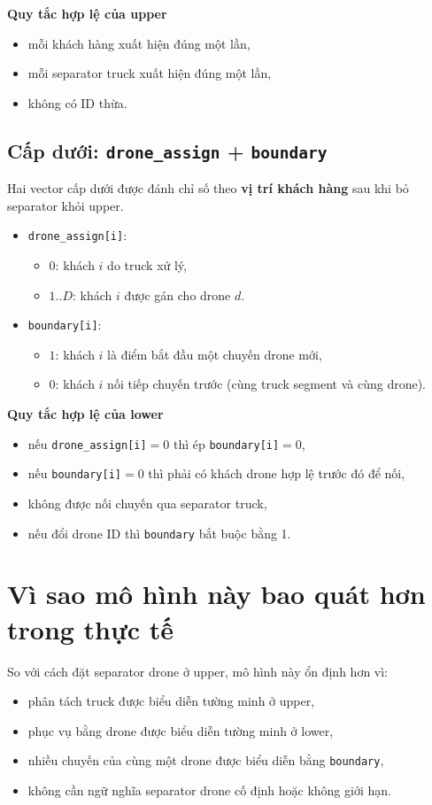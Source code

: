 \documentclass[12pt,a4paper]{article}
\begin{document}
\textbf{Quy tắc hợp lệ của upper}
\begin{itemize}[leftmargin=1.2cm]
    \item mỗi khách hàng xuất hiện đúng một lần,
    \item mỗi separator truck xuất hiện đúng một lần,
    \item không có ID thừa.
\end{itemize}

\subsection{Cấp dưới: \texttt{drone\_assign} + \texttt{boundary}}
Hai vector cấp dưới được đánh chỉ số theo \textbf{vị trí khách hàng} sau khi bỏ separator khỏi upper.

\begin{itemize}[leftmargin=1.2cm]
    \item \texttt{drone\_assign[i]}:
    \begin{itemize}
        \item $0$: khách $i$ do truck xử lý,
        \item $1..D$: khách $i$ được gán cho drone $d$.
    \end{itemize}
    \item \texttt{boundary[i]}:
    \begin{itemize}
        \item $1$: khách $i$ là điểm bắt đầu một chuyến drone mới,
        \item $0$: khách $i$ nối tiếp chuyến trước (cùng truck segment và cùng drone).
    \end{itemize}
\end{itemize}

\textbf{Quy tắc hợp lệ của lower}
\begin{itemize}[leftmargin=1.2cm]
    \item nếu \texttt{drone\_assign[i]}$=0$ thì ép \texttt{boundary[i]}$=0$,
    \item nếu \texttt{boundary[i]}$=0$ thì phải có khách drone hợp lệ trước đó để nối,
    \item không được nối chuyến qua separator truck,
    \item nếu đổi drone ID thì \texttt{boundary} bắt buộc bằng 1.
\end{itemize}

\section{Vì sao mô hình này bao quát hơn trong thực tế}
So với cách đặt separator drone ở upper, mô hình này ổn định hơn vì:
\begin{itemize}[leftmargin=1.2cm]
    \item phân tách truck được biểu diễn tường minh ở upper,
    \item phục vụ bằng drone được biểu diễn tường minh ở lower,
    \item nhiều chuyến của cùng một drone được biểu diễn bằng \texttt{boundary},
    \item không cần ngữ nghĩa separator drone cố định hoặc không giới hạn.
\end{itemize}
\end{document}
